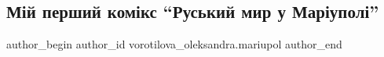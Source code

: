  
 
 
 
 

\subsection{Мій перший комікс \enquote{Руський мир у Маріуполі}}
\label{sec:22_05_2022.fb.vorotilova_oleksandra.mariupol.1.m_i_pershii_kom_ks__}

\ifcmt
 author_begin
   author_id vorotilova_oleksandra.mariupol
 author_end
\fi
